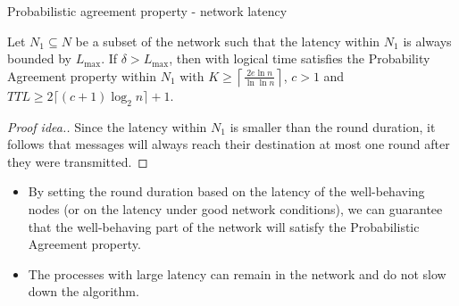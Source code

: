 \begin{frame}{Probabilistic agreement property - network latency}
  
\begin{lemma}
\label{lem:latency}
Let $N_1 \subseteq N$ be a subset of the network such that the latency within $N_1$ is always bounded by $L_\text{max}$. If $\delta > L_{\max}$, then \EPTO{} with logical time satisfies the Probability Agreement property within $N_1$ with $K \geq \left\lceil\frac{2e\ln n}{\ln\ln n}\right\rceil$, $c>1$ and $TTL \geq 2 \lceil (c+1) \log_2 n \rceil+1$. 
\end{lemma}

\begin{proof}[Proof idea.]
Since the latency within $N_1$ is smaller than the round duration, it follows that messages will always reach their destination at most one round after they were transmitted.
\end{proof}

\begin{snugshade}
  \begin{itemize}
  \item By setting the round duration based on the latency of the well-behaving nodes (or on the latency under good network conditions), we can guarantee that the well-behaving part of the network will satisfy the Probabilistic Agreement property. 

\item The processes with large latency can remain in the network and do not slow down the algorithm.

  \end{itemize}

\end{snugshade}

\end{frame}




